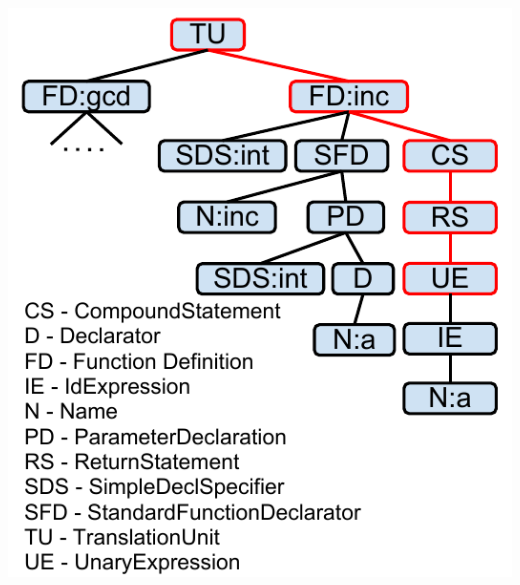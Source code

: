 \documentclass[]{beamer}
\begin{document}
\begin{frame}
\begin{columns}[c]
  \includegraphics[height=.75\textheight]{ast22}
  \end{columns}
\end{frame}
\end{document}
